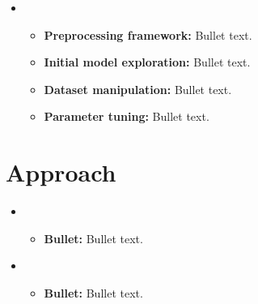 \begin{itemize}
\begin{itemize}
    \end{itemize}

    \item {}
    \begin{itemize}
    \item \textbf{Preprocessing framework:} Bullet text.
    \item \textbf{Initial model exploration:} Bullet text.
    \item \textbf{Dataset manipulation:} Bullet text.
    \item \textbf{Parameter tuning:} Bullet text.
    \end{itemize}

\end{itemize}



\section{Approach}
\medskip
\begin{itemize}

    \item {}
    \begin{itemize}
    \item \textbf{Bullet:} Bullet text.
    \end{itemize}

    \item {}
    \begin{itemize}
    \item \textbf{Bullet:} Bullet text.


    \end{itemize}

\end{itemize}



